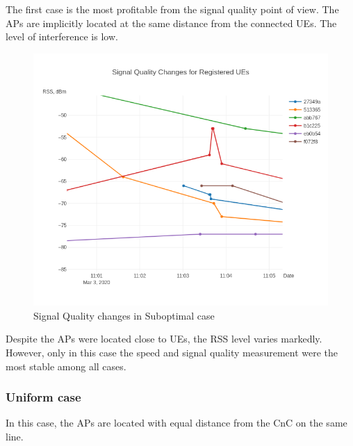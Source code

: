 The first case is the most profitable from the signal quality point of
view. The APs are implicitly located at the same distance from the
connected UEs. The level of interference is low.

\begin{figure}[H]
	\centering
	\includegraphics[width=\linewidth,keepaspectratio]{images/Exp4_Suboptimal.png}
\caption{Signal Quality changes in Suboptimal case}
\end{figure}

Despite the APs were located close to UEs, the RSS level varies
markedly. However, only in this case the speed and signal quality
measurement were the most stable among all cases.

\hypertarget{uniform-case}{%
\subsubsection{Uniform case}\label{uniform-case}}

In this case, the APs are located with equal distance from the CnC on
the same line.

